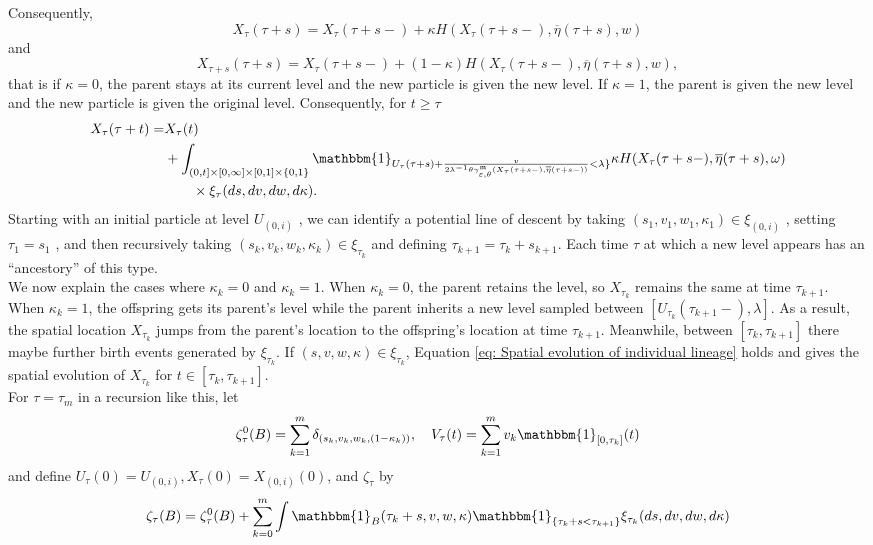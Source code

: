 \documentclass[12pt]{article}
\begin{document}
Consequently, 
$$X_{\tau}(\tau+s)=X_{\tau}(\tau+s-)+\kappa H(X_{\tau}(\tau+s-), \overline{\eta}(\tau+s),w)$$
and 
$$X_{\tau+s}(\tau+s)=X_{\tau}(\tau+s-)+(1-\kappa) H(X_{\tau}(\tau+s-), \overline{\eta}(\tau+s),w),$$
that is if $\kappa=0$, the parent stays at its current level and the new particle is given the new
level. If $\kappa = 1 $, the parent is given the new level and the new particle is given the original
level. Consequently, for $t \geq \tau$
\begin{align}\label{eq: Spatial evolution of individual lineage}
X_{\tau}(\tau+t)=&X_{\tau}(t)\\
&+\int_{(0,t]\times[0,\infty]\times[0,1]\times\{0,1\}}\mathbbm{1}_{U_{\tau}(\tau+s)+ \frac{v}{2\lambda^{-1} \theta \gamma^{\mathfrak{m}}_{\varepsilon,\theta}(X_{\tau}(\tau+s-), \overline{\eta}(\tau+s-))}<\lambda\}}\kappa    H(X_{\tau}(\tau+s-), \overline{\eta}(\tau+s),\omega) \\
&\qquad \times \xi_{\tau}(ds,dv,dw,d\kappa).
\end{align}
Starting with an initial particle at level $U_{(0,i)}$ , we can identify a potential line of descent by
taking $(s_1 , v_1 , w_1 , \kappa_1 ) \in \xi_{(0,i)}$ , setting $\tau_1=s_1$ , and then recursively taking $(s_k , v_k , w_k , \kappa_k ) \in \xi_{\tau_k }$ and defining $\tau_{k+1} = \tau_{k} + s_{k+1}$. Each time $\tau$ at which a new level appears has an “ancestory” of this type.\\
We now explain the cases where $\kappa_k=0$ and $\kappa_k=1$. When $\kappa_k=0$, the parent retains the level, so $X_{\tau_{k}}$ remains the same at time $\tau_{k+1}$. When $\kappa_k=1$, the offspring gets its parent's level while the parent inherits a new level sampled between $[U_{\tau_k}(\tau_{k+1}-),\lambda]$. As a result, the spatial location $X_{\tau_{k}}$ jumps from the parent's location to the offspring's location at time $\tau_{k+1}$.  Meanwhile, between $[\tau_k, \tau_{k+1}]$ there maybe further birth events generated by $\xi_{\tau_k}$. If $(s,v,w,\kappa) \in \xi_{\tau_k}$, Equation \eqref{eq: Spatial evolution of individual lineage} holds and gives the spatial evolution of $X_{\tau_k}$ for $t \in [\tau_k, \tau_{k+1}]$.\\

For $\tau=\tau_m$ in a recursion like this, let
\begin{equation}\label{eq: Individual Evolution Recursion Terms}
\zeta^{0}_{\tau}(B)=\sum_{k=1}^{m}\delta_{(s_k,v_k,w_k,(1-\kappa_k))}, ~~~ V_{\tau}(t)=\sum_{k=1}^{m}v_k\mathbbm{1}_{[0, \tau_k]}  (t)  
\end{equation}
and define $U_{\tau}(0)=U_{(0,i)}, X_{\tau}(0)=X_{(0,i)}(0)$, and $\zeta_{\tau}$ by
\begin{equation}\label{eq: integrand in spatial tracing}
\zeta_{\tau}(B)=\zeta_{\tau}^{0}(B)+\sum_{k=0}^{m}\int \mathbbm{1}_{B}(\tau_k+s,v,w,\kappa)\mathbbm{1}_{\{\tau_k+s<\tau_{k+1}\}}\xi_{\tau_k}(ds,dv,dw,d\kappa)    
\end{equation}
\end{document}
